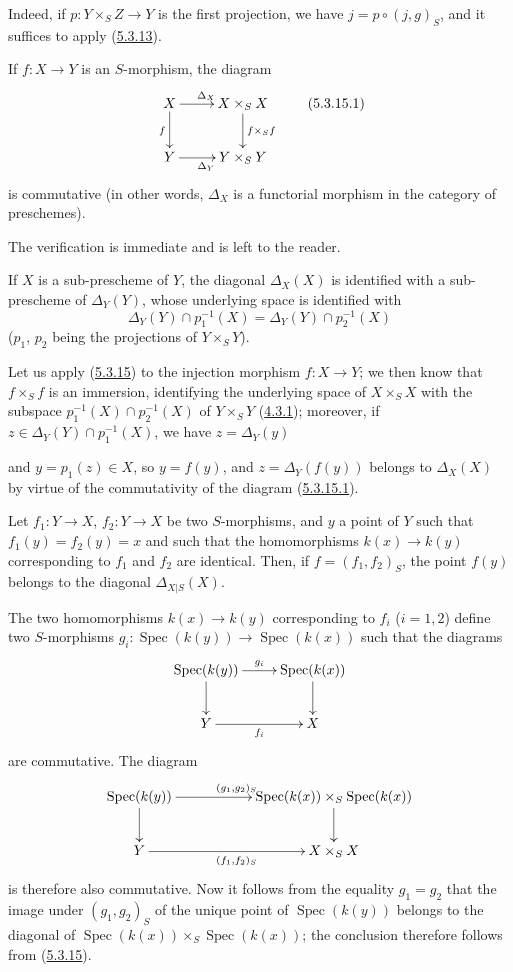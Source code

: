 Indeed, if $p:Y\times_S Z\to Y$ is the first projection, we have
$j=p\circ(j,g)_S$, and it suffices to apply
(\hyperref[I.5.3.13]{5.3.13}).

\begin{proposition}[5.3.15]
\label{I.5.3.15}
If $f:X\to Y$ is an $S$-morphism, the diagram
\[
  \xymatrix{
    X\ar[r]^{\Delta_X}\ar[d]_f &
    X\times_S X\ar[d]^{f\times_S f}\\
    Y\ar[r]_{\Delta_Y} &
    Y\times_S Y
  }
  \tag{5.3.15.1}\label{I.5.3.15.1}
\]
is commutative (in other words, $\Delta_X$ is a functorial morphism
in the category of preschemes).
\end{proposition}

The verification is immediate and is left to the reader.

\begin{corollary}[5.3.16]
\label{I.5.3.16}
If $X$ is a sub-prescheme of $Y$, the diagonal $\Delta_X(X)$ is identified with
a sub-prescheme of $\Delta_Y(Y)$, whose underlying space is identified with
\[
  \Delta_Y(Y)\cap p_1^{-1}(X)=\Delta_Y(Y)\cap p_2^{-1}(X)
\]
($p_1$, $p_2$ being the projections of $Y\times_S Y$).
\end{corollary}

Let us apply (\hyperref[I.5.3.15]{5.3.15}) to the injection morphism
$f:X\to Y$; we then know that $f\times_S f$ is an immersion, identifying
the underlying space of $X\times_S X$ with the subspace
$p_1^{-1}(X)\cap p_2^{-1}(X)$ of $Y\times_S Y$
(\hyperref[I.4.3.1]{4.3.1}); moreover, if
$z\in\Delta_Y(Y)\cap p_1^{-1}(X)$, we have $z=\Delta_Y(y)$

and $y=p_1(z)\in X$, so $y=f(y)$, and $z=\Delta_Y(f(y))$ belongs to
$\Delta_X(X)$ by virtue of the commutativity of the diagram
(\hyperref[I.5.3.15.1]{5.3.15.1}).

\begin{corollary}[5.3.17]
\label{I.5.3.17}
Let $f_1:Y\to X$, $f_2:Y\to X$ be two $S$-morphisms, and $y$ a point of $Y$
such that $f_1(y)=f_2(y)=x$ and such that the homomorphisms $k(x)\to k(y)$
corresponding to $f_1$ and $f_2$ are identical. Then, if
$f=(f_1,f_2)_S$, the point $f(y)$ belongs to the diagonal
$\Delta_{X|S}(X)$.
\end{corollary}

The two homomorphisms $k(x)\to k(y)$ corresponding to $f_i$ ($i=1,2$)
define two $S$-morphisms
$g_i:\operatorname{Spec}(k(y))\to\operatorname{Spec}(k(x))$ such that the
diagrams
\[
  \xymatrix{
    \operatorname{Spec}(k(y))\ar[r]^{g_i}\ar[d] &
    \operatorname{Spec}(k(x))\ar[d]\\
    Y\ar[r]_{f_i} & X
  }
\]
are commutative. The diagram
\[
  \xymatrix{
    \operatorname{Spec}(k(y))\ar[rr]^{(g_1,g_2)_S}\ar[d] & &
    \operatorname{Spec}(k(x))\times_S\operatorname{Spec}(k(x))\ar[d]\\
    Y\ar[rr]_{(f_1,f_2)_S} & & X\times_S X
  }
\]
is therefore also commutative. Now it follows from the equality $g_1=g_2$
that the image under $(g_1,g_2)_S$ of the unique point of
$\operatorname{Spec}(k(y))$ belongs to the diagonal of
$\operatorname{Spec}(k(x))\times_S\operatorname{Spec}(k(x))$; the conclusion
therefore follows from (\hyperref[I.5.3.15]{5.3.15}).

